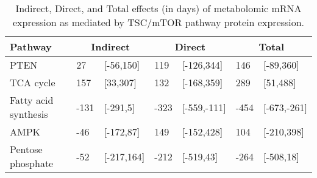 \begin{table}[ht]
\centering
\begin{tabular}{lllllll}
  \hline
  Pathway & \multicolumn{2}{c}{Indirect} & \multicolumn{2}{c}{Direct}  & \multicolumn{2}{c}{Total} \\
 \hline
PTEN & 27 & [-56,150] & 119 & [-126,344] & 146 & [-89,360] \\ 
  TCA cycle & 157 & [33,307] & 132 & [-168,359] & 289 & [51,488] \\ 
  Fatty acid synthesis & -131 & [-291,5] & -323 & [-559,-111] & -454 & [-673,-261] \\ 
  AMPK & -46 & [-172,87] & 149 & [-152,428] & 104 & [-210,398] \\ 
  Pentose phosphate & -52 & [-217,164] & -212 & [-519,43] & -264 & [-508,18] \\ 
   \hline
\end{tabular}
\caption{Indirect, Direct, and Total effects (in days) of metabolomic mRNA expression as mediated by TSC/mTOR pathway protein expression.} 
\end{table}
